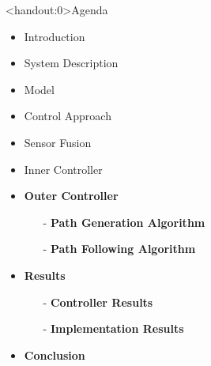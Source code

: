 
\begin{frame}<handout:0>{Agenda}{}
    \begin{itemize}
        \item Introduction
        \item System Description
        \item Model
        \item Control Approach
        \item Sensor Fusion
        \item Inner Controller
        \item \textcolor{aaublue}{\textbf{Outer Controller}}
        \begin{itemize}
            \item[-] \textcolor{aaublue}{\textbf{Path Generation Algorithm}}
            \item[-] \textcolor{aaublue}{\textbf{Path Following Algorithm}}
        \end{itemize}
        \item \textcolor{aaublue}{\textbf{Results}}
        \begin{itemize}
            \item[-] \textcolor{aaublue}{\textbf{Controller Results}}
            \item[-] \textcolor{aaublue}{\textbf{Implementation Results}}
        \end{itemize}
        \item \textcolor{aaublue}{\textbf{Conclusion}}
    \end{itemize}
\end{frame}